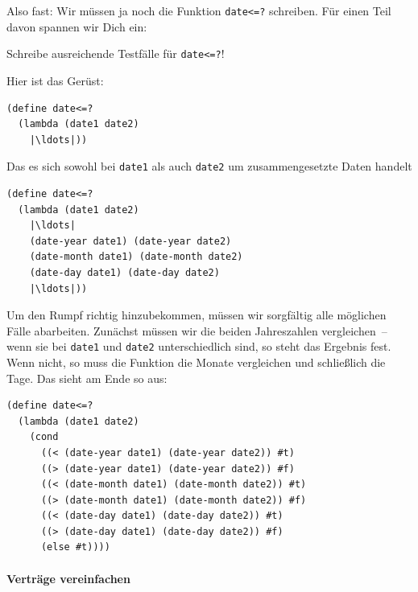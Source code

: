 Also fast: Wir müssen ja noch die Funktion \lstinline{date<=?}
schreiben.  Für einen Teil davon spannen wir Dich ein:
%
\begin{aufgabeinline}
  Schreibe ausreichende Testfälle für \lstinline{date<=?}!
\end{aufgabeinline}
%
Hier ist das Gerüst:
%
\begin{lstlisting}
(define date<=?
  (lambda (date1 date2)
    |\ldots|))
\end{lstlisting}    
%
Das es sich sowohl bei \lstinline{date1} als auch \lstinline{date2} um
zusammengesetzte Daten handelt
%
\begin{lstlisting}
(define date<=?
  (lambda (date1 date2)
    |\ldots|
    (date-year date1) (date-year date2)
    (date-month date1) (date-month date2)
    (date-day date1) (date-day date2)
    |\ldots|))
\end{lstlisting}    
%
Um den Rumpf richtig hinzubekommen, müssen wir sorgfältig alle
möglichen Fälle abarbeiten.  Zunächst müssen wir die beiden
Jahreszahlen vergleichen~-- wenn sie bei \lstinline{date1} und
\lstinline{date2} unterschiedlich sind, so steht das Ergebnis fest.
Wenn nicht, so muss die Funktion die Monate vergleichen und
schließlich die Tage.  Das sieht am Ende so aus:
%
\begin{lstlisting}
(define date<=?
  (lambda (date1 date2)
    (cond
      ((< (date-year date1) (date-year date2)) #t)
      ((> (date-year date1) (date-year date2)) #f)
      ((< (date-month date1) (date-month date2)) #t)
      ((> (date-month date1) (date-month date2)) #f)
      ((< (date-day date1) (date-day date2)) #t)
      ((> (date-day date1) (date-day date2)) #f)
      (else #t))))
\end{lstlisting}
    
\paragraph{Verträge vereinfachen}

